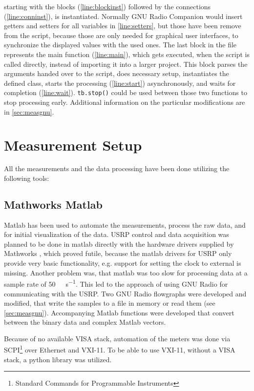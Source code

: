 \documentclass[12pt,a4paper,parskip=full]{scrartcl}
\begin{document}
starting with the blocks (\cref{line:blockinst}) followed by the connections
(\cref{line:conninst}), is instantiated. Normally GNU Radio Companion would insert
getters and setters for all variables in \cref{line:setters}, but those have been
remove from the script, because those are only needed for graphical user interfaces,
to synchronize the displayed values with the used ones. The last block in the file
represents the main function (\cref{line:main}), which gets executed, when the script
is called directly, instead of importing it into a larger project. This block parses
the arguments handed over to the script, does necessary setup, instantiates
the defined class, starts the processing (\cref{line:start}) asynchronously, and waits for completion
(\cref{line:wait}). \lstinline{tb.stop()} could be used between those two functions to
stop processing early. Additional information on the particular modifications are in
\cref{sec:measgnu}.
\section{Measurement Setup}
All the measurements and the data processing have been done utilizing the following tools:
\subsection{Mathworks Matlab}
Matlab has been used to automate the measurements, process the raw data, and for
initial visualization of the data. USRP control and data acquisition was planned to
be done in matlab directly with the hardware drivers supplied by Mathworks \cite{matlab_usrp},
which proved futile, because the matlab drivers for
USRP only provide very basic functionality, e.g. support for setting the clock to
external is missing. Another problem was, that matlab was too slow for processing
data at a sample rate of \SI{50}{\mega\samples\per\second}. This led to the approach of
using GNU Radio for communicating with the USRP. Two GNU Radio flowgraphs were
developed and modified, that write the samples to a file in memory or read them
(see \cref{sec:measgnu}). Accompanying Matlab functions were developed that convert
between the binary data and complex Matlab vectors.

Because of no available VISA stack, automation of the meters was done via
SCPI\footnote{Standard Commands for Programmable Instruments} over Ethernet and VXI-11.
To be able to use VXI-11, without a VISA stack, a python library \cite{yamamoto_vxi-11} was
utilized.
\end{document}
